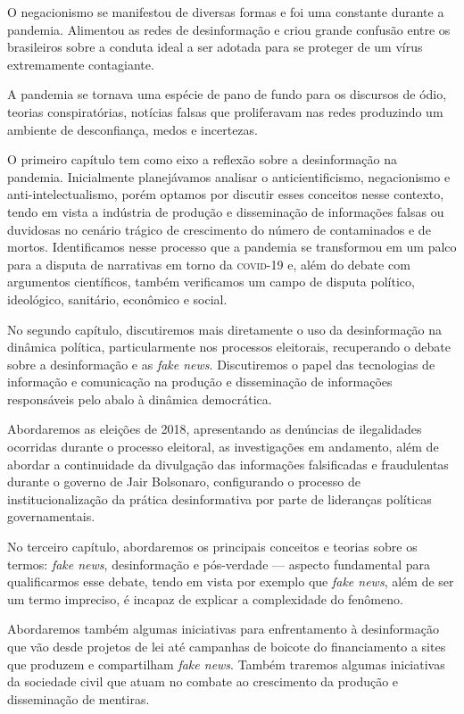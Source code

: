 O negacionismo se manifestou de diversas formas e foi uma constante
durante a pandemia. Alimentou as redes de desinformação e criou
grande confusão entre os brasileiros sobre a conduta ideal a ser adotada
para se proteger de um vírus extremamente contagiante.

A pandemia se tornava uma espécie de pano de fundo para os discursos de
ódio, teorias conspiratórias, notícias falsas que proliferavam nas redes
produzindo um ambiente de desconfiança, medos e incertezas.

O primeiro capítulo tem como eixo a reflexão sobre a desinformação na pandemia.
Inicialmente planejávamos analisar o anticientificismo, negacionismo e
anti-intelectualismo, porém optamos por discutir esses conceitos nesse
contexto, tendo em vista a indústria de produção e disseminação de
informações falsas ou duvidosas no cenário trágico de crescimento do
número de contaminados e de mortos. Identificamos nesse processo que a
pandemia se transformou em um palco para a disputa de narrativas em
torno da \textsc{covid-19} e, além do debate com argumentos científicos, também
verificamos um campo de disputa político, ideológico, sanitário,
econômico e social.

No segundo capítulo, discutiremos mais diretamente o uso da desinformação
na dinâmica política, particularmente nos processos eleitorais,
recuperando o debate sobre a desinformação e as \textit{fake news}. Discutiremos o
papel das tecnologias de informação e comunicação na produção e
disseminação de informações responsáveis pelo abalo à dinâmica
democrática.

Abordaremos as eleições de 2018, apresentando as denúncias de
ilegalidades ocorridas durante o processo eleitoral, as investigações em
andamento, além de abordar a continuidade da divulgação das informações
falsificadas e fraudulentas durante o governo de Jair Bolsonaro,
configurando o processo de institucionalização da prática desinformativa
por parte de lideranças políticas governamentais.

No terceiro capítulo, abordaremos os principais conceitos e teorias sobre os
termos: \textit{fake news}, desinformação e pós-verdade --- aspecto fundamental para
qualificarmos esse debate, tendo em vista por exemplo que \textit{fake news}, além de ser um
termo impreciso, é incapaz de explicar a complexidade do fenômeno.

Abordaremos também algumas iniciativas para enfrentamento à
desinformação que vão desde projetos de lei até campanhas de boicote do
financiamento a sites que produzem e compartilham \textit{fake news}. Também
traremos algumas iniciativas da sociedade civil que atuam no combate ao
crescimento da produção e disseminação de mentiras.

